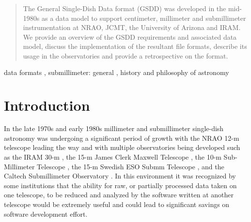 \documentclass[final,authoryear,5p,times,twocolumn]{elsarticle}
\begin{document}
\begin{frontmatter}
\begin{abstract}

The General Single-Dish Data format (GSDD) was developed in the
mid-1980s as a data model to support centimeter, millimeter and submillimeter
instrumentation at NRAO, JCMT, the University of Arizona and IRAM. We
provide an overview of the GSDD
requirements and associated data model, discuss the implementation
of the resultant file formats, describe its usage in the observatories and
provide a retrospective on the format.

\end{abstract}

\begin{keyword}


data formats \sep
submillimeter: general \sep
history and philosophy of astronomy

\end{keyword}

\end{frontmatter}


\newcommand{\mnras}{MNRAS}
\newcommand{\aap}{A\&A}
\newcommand{\aaps}{A\&AS}
\newcommand{\pasp}{PASP}
\newcommand{\apj}{ApJ}
\newcommand{\apjs}{ApJS}
\newcommand{\qjras}{QJRAS}
\newcommand{\an}{Astron.\ Nach.}
\newcommand{\ijimw}{Int.\ J.\ Infrared \& Millimeter Waves}
\newcommand{\procspie}{Proc.\ SPIE}
\newcommand{\aspconf}{ASP Conf. Ser.}






\section{Introduction}

In the late 1970s and early 1980s millimeter and submillimeter
single-dish astronomy was undergoing a significant period of growth
\citep[see e.g.,][]{2013ASSP...37...39R} with the NRAO 12-m telescope
leading the way \citep[see e.g.,][]{2005ASSL..323.....G} and with
multiple observatories being developed such as the IRAM 30-m
\citep{1981MitAG..54...61B}, the 15-m James Clerk Maxwell Telescope
\citep[JCMT;][]{1985ESOC...22...63H}, the 10-m Sub-Millimeter
Telescope \citep[SMT;][]{1985ESOC...22...71W}, the 15-m Swedish ESO
Submm Telescope \citep[SEST;][]{1985ESOC...22...25D}, and the Caltech
Submillimeter Observatory \citep[CSO;][]{1988BAAS...20..690P}. In this
environment it was recognized by some institutions that the ability
for raw, or partially processed data taken on one telescope, to be
reduced and analyzed by the software written at another telescope
would be extremely useful and could lead to significant savings on
software development effort.
\end{document}
